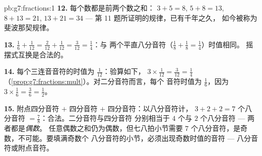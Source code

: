 \begin{solution}{pb:g7:fractions:1}
\textbf{12.} 每个数都是前两个数之和：
$3 + 5 = 8$, $5 + 8 = 13$, $8 + 13 = 21$, $13 + 21 = 34$ ---
第 11 题所证明的规律，已有千年之久，
如今被称为斐波那契规律。

\textbf{13.} $\frac16 + \frac{1}{12} = \frac{2}{12} +
\frac{1}{12} = \frac{3}{12} = \frac14$：与
两个平直八分音符（$\frac18 + \frac18 = \frac14$）时值相同。
摇摆式互换是合法的。

\textbf{14.} 每个三连音音符的时值为 $\frac{1}{12}$：验算如下，
$3 \times \frac{1}{12} = \frac{3}{12} = \frac14$
（\cref{prop:g7:fractions:mult}）。对二分音符而言，每个
音符时值为 $\frac16$，因为 $3 \times \frac16 = \frac36 = \frac12$。

\textbf{15.} 附点四分音符 $+$ 四分音符 $+$ 四分音符：以八分音符计，
$3 + 2 + 2 = 7$ 个八分音符 $= \frac78$：合法。二分音符与四分音符
分别相当于 $4$ 个与 $2$ 个八分音符 --- 两者都是\emph{偶数}。
任意偶数之和仍为偶数，但七八拍小节需要
$7$ 个八分音符，是奇数，不可能。要填满奇数个
八分音符的小节，必须出现奇数时值的音符 --- 八分音符或附点音符。
\end{solution}
